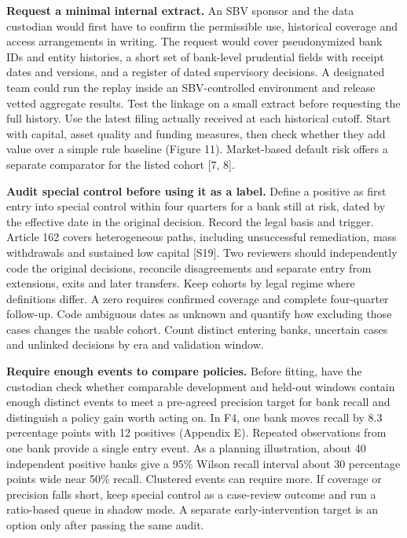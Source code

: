 \documentclass[
  12pt,
  a4paper,
]{article}
\begin{document}
\textbf{Request a minimal internal extract.} An SBV sponsor and the data
custodian would first have to confirm the permissible use, historical
coverage and access arrangements in writing. The request would cover
pseudonymized bank IDs and entity histories, a short set of bank-level
prudential fields with receipt dates and versions, and a register of
dated supervisory decisions. A designated team could run the replay
inside an SBV-controlled environment and release vetted aggregate
results. Test the linkage on a small extract before requesting the full
history. Use the latest filing actually received at each historical
cutoff. Start with capital, asset quality and funding measures, then
check whether they add value over a simple rule baseline (Figure 11).
Market-based default risk offers a separate comparator for the listed
cohort {[}7, 8{]}.

\textbf{Audit special control before using it as a label.} Define a
positive as first entry into special control within four quarters for a
bank still at risk, dated by the effective date in the original
decision. Record the legal basis and trigger. Article 162 covers
heterogeneous paths, including unsuccessful remediation, mass
withdrawals and sustained low capital {[}S19{]}. Two reviewers should
independently code the original decisions, reconcile disagreements and
separate entry from extensions, exits and later transfers. Keep cohorts
by legal regime where definitions differ. A zero requires confirmed
coverage and complete four-quarter follow-up. Code ambiguous dates as
unknown and quantify how excluding those cases changes the usable
cohort. Count distinct entering banks, uncertain cases and unlinked
decisions by era and validation window.

\textbf{Require enough events to compare policies.} Before fitting, have
the custodian check whether comparable development and held-out windows
contain enough distinct events to meet a pre-agreed precision target for
bank recall and distinguish a policy gain worth acting on. In F4, one
bank moves recall by 8.3 percentage points with 12 positives (Appendix
E). Repeated observations from one bank provide a single entry event. As
a planning illustration, about 40 independent positive banks give a 95\%
Wilson recall interval about 30 percentage points wide near 50\% recall.
Clustered events can require more. If coverage or precision falls short,
keep special control as a case-review outcome and run a ratio-based
queue in shadow mode. A separate early-intervention target is an option
only after passing the same audit.
\end{document}
